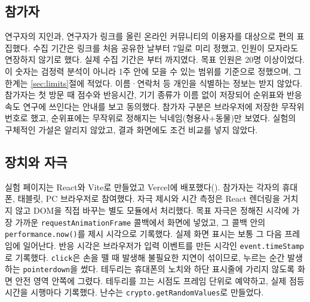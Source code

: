 \subsection{참가자}
연구자의 지인과, 연구자가 링크를 올린 온라인 커뮤니티의 이용자를 대상으로 편의 표집했다.
수집 기간은 링크를 처음 공유한 날부터 7일로 미리 정했고, 인원이 모자라도 연장하지 않기로 했다.
실제 수집 기간은 \CollectStart{}부터 \CollectEnd{}까지였다.
목표 인원은 20명 이상이었다.
이 숫자는 검정력 분석이 아니라 1주 안에 모을 수 있는 범위를 기준으로 정했으며, 그 한계는 \ref{sec:limits}절에 적었다.
이름·연락처 등 개인을 식별하는 정보는 받지 않았다.
참가자는 첫 방문 때 점수와 반응시간, 기기 종류가 이름 없이 저장되어 순위표와 반응속도 연구에 쓰인다는 안내를 보고 동의했다.
참가자 구분은 브라우저에 저장한 무작위 번호로 했고, 순위표에는 무작위로 정해지는 닉네임(형용사+동물)만 보였다.
실험의 구체적인 가설은 알리지 않았고, 결과 화면에도 조건 비교를 넣지 않았다.

\subsection{장치와 자극}
실험 페이지는 React와 Vite로 만들었고 Vercel에 배포했다(\ExperimentURL).
참가자는 각자의 휴대폰, 태블릿, PC 브라우저로 참여했다.
자극 제시와 시간 측정은 React 렌더링을 거치지 않고 DOM을 직접 바꾸는 별도 모듈에서 처리했다.
목표 자극은 정해진 시각에 가장 가까운 \texttt{requestAnimationFrame} 콜백에서 화면에 넣었고, 그 콜백 안의 \texttt{performance.now()}를 제시 시각으로 기록했다.
실제 화면 표시는 보통 그 다음 프레임에 일어난다.
반응 시각은 브라우저가 입력 이벤트를 만든 시각인 \texttt{event.timeStamp}로 기록했다.
\texttt{click}은 손을 뗄 때 발생해 불필요한 지연이 섞이므로, 누르는 순간 발생하는 \texttt{pointerdown}을 썼다.
테두리는 휴대폰의 노치와 하단 표시줄에 가리지 않도록 화면 안전 영역 안쪽에 그렸다.
테두리를 끄는 시점도 프레임 단위로 예약하고, 실제 점등 시간을 시행마다 기록했다.
난수는 \texttt{crypto.getRandomValues}로 만들었다.

